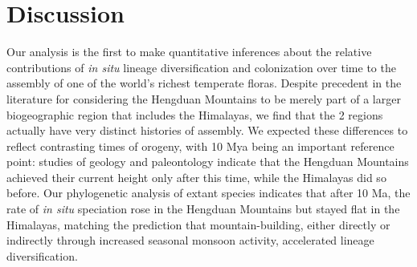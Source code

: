 \section{Discussion}

Our analysis is the first to make quantitative inferences about the relative contributions of \textit{in situ} lineage diversification and colonization over time to the assembly of one of the world's richest temperate floras. Despite precedent in the literature for considering the Hengduan Mountains to be merely part of a larger biogeographic region that includes the Himalayas, we find that the 2 regions actually have very distinct histories of assembly. We expected these differences to reflect contrasting times of orogeny, with 10 Mya being an important reference point: studies of geology and paleontology indicate that the Hengduan Mountains achieved their current height only after this time, while the Himalayas did so before. Our phylogenetic analysis of extant species indicates that after 10 Ma, the rate of \textit{in situ} speciation rose in the Hengduan Mountains but stayed flat in the Himalayas, matching the prediction that mountain-building, either directly or indirectly through increased seasonal monsoon activity, accelerated lineage diversification.